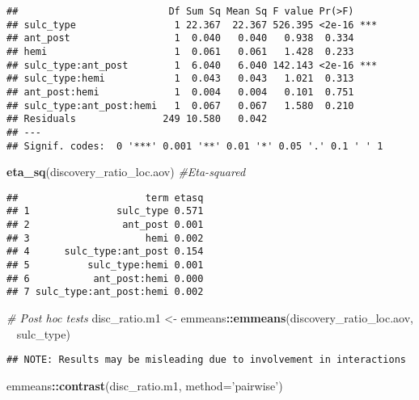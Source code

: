 \documentclass[
]{article}
\newenvironment{Shaded}{\begin{snugshade}}{\end{snugshade}}
\newcommand{\CommentTok}[1]{\textcolor[rgb]{0.56,0.35,0.01}{\textit{#1}}}
\newcommand{\DataTypeTok}[1]{\textcolor[rgb]{0.13,0.29,0.53}{#1}}
\newcommand{\KeywordTok}[1]{\textcolor[rgb]{0.13,0.29,0.53}{\textbf{#1}}}
\newcommand{\NormalTok}[1]{#1}
\newcommand{\OperatorTok}[1]{\textcolor[rgb]{0.81,0.36,0.00}{\textbf{#1}}}
\newcommand{\StringTok}[1]{\textcolor[rgb]{0.31,0.60,0.02}{#1}}
\begin{document}
\begin{verbatim}
##                          Df Sum Sq Mean Sq F value Pr(>F)    
## sulc_type                 1 22.367  22.367 526.395 <2e-16 ***
## ant_post                  1  0.040   0.040   0.938  0.334    
## hemi                      1  0.061   0.061   1.428  0.233    
## sulc_type:ant_post        1  6.040   6.040 142.143 <2e-16 ***
## sulc_type:hemi            1  0.043   0.043   1.021  0.313    
## ant_post:hemi             1  0.004   0.004   0.101  0.751    
## sulc_type:ant_post:hemi   1  0.067   0.067   1.580  0.210    
## Residuals               249 10.580   0.042                   
## ---
## Signif. codes:  0 '***' 0.001 '**' 0.01 '*' 0.05 '.' 0.1 ' ' 1
\end{verbatim}

\begin{Shaded}
\begin{Highlighting}[]
\KeywordTok{eta_sq}\NormalTok{(discovery_ratio_loc.aov) }\CommentTok{#Eta-squared}
\end{Highlighting}
\end{Shaded}

\begin{verbatim}
##                      term etasq
## 1               sulc_type 0.571
## 2                ant_post 0.001
## 3                    hemi 0.002
## 4      sulc_type:ant_post 0.154
## 5          sulc_type:hemi 0.001
## 6           ant_post:hemi 0.000
## 7 sulc_type:ant_post:hemi 0.002
\end{verbatim}

\begin{Shaded}
\begin{Highlighting}[]
\CommentTok{# Post hoc tests}
\NormalTok{disc_ratio.m1 <-}\StringTok{ }\NormalTok{emmeans}\OperatorTok{::}\KeywordTok{emmeans}\NormalTok{(discovery_ratio_loc.aov, }\OperatorTok{~}\StringTok{ }\NormalTok{sulc_type)}
\end{Highlighting}
\end{Shaded}

\begin{verbatim}
## NOTE: Results may be misleading due to involvement in interactions
\end{verbatim}

\begin{Shaded}
\begin{Highlighting}[]
\NormalTok{emmeans}\OperatorTok{::}\KeywordTok{contrast}\NormalTok{(disc_ratio.m1, }\DataTypeTok{method=}\StringTok{'pairwise'}\NormalTok{)}
\end{Highlighting}
\end{Shaded}
\end{document}
